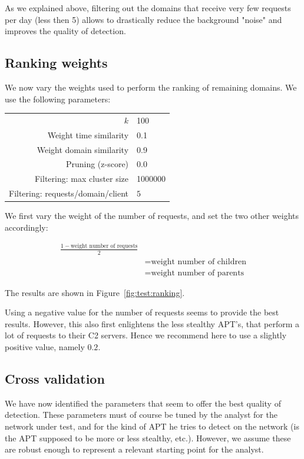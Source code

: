 \documentclass[conference]{IEEEtran}
\begin{document}
As we explained above, filtering out the domains that receive very few requests per day (less then 5) allows to drastically reduce the background "noise" and improves the quality of detection.

\subsection{Ranking weights}

We now vary the weights used to perform the ranking of remaining domains. We use the following parameters:

{\small
  \begin{tabularx}{\linewidth}{rl}
  \hline
  $k$ & 100 \\
  Weight time similarity & 0.1 \\ 
  Weight domain similarity & 0.9 \\
  Pruning (z-score) & 0.0 \\
  Filtering: max cluster size & 1000000 \\
  Filtering: requests/domain/client & $5$ \\
  \hline
  \end{tabularx}
}

We first vary the weight of the number of requests, and set the two other weights accordingly:

\begin{equation*}
\begin{split}
 \frac{1 - \text{weight number of requests}}{2} \\
    & = \text{weight number of children} \\
    & = \text{weight number of parents}
\end{split}
\end{equation*}

The results are shown in Figure~\ref{fig:test:ranking}.

Using a negative value for the number of requests seems to provide the best results. However, this also first enlightens the less stealthy APT's, that perform a lot of requests to their C2 servers. Hence we recommend here to use a slightly positive value, namely $0.2$.

\subsection{Cross validation}

We have now identified the parameters that seem to offer the best quality of detection. These parameters must of course be tuned by the analyst for the network under test, and for the kind of APT he tries to detect on the network (is the APT supposed to be more or less stealthy, etc.). However, we assume these are robust enough to represent a relevant starting point for the analyst.
\end{document}
